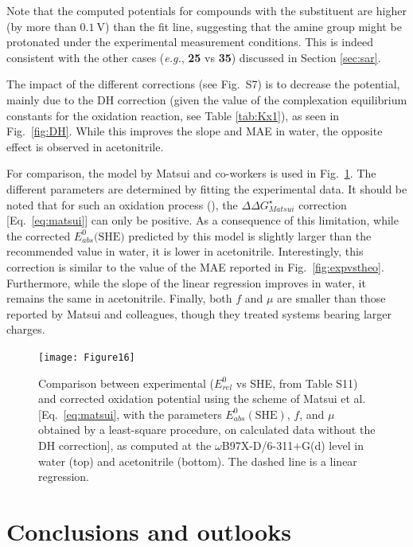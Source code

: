 \documentclass[review,preprint]{elsarticle}
\begin{document}
Note that the computed potentials for compounds with the   substituent are higher (by more than $\SI{0.1}{\volt}$) than the fit line, suggesting that the amine group might be protonated under the experimental measurement conditions. This is indeed consistent with the other cases (\textit{e.g.}, \textbf{25} vs \textbf{35}) discussed in Section \ref{sec:sar}. 

The impact of the different corrections (see Fig.~S7) is to decrease the potential, mainly due to the DH correction (given the value of the complexation equilibrium constants for the oxidation reaction, see Table \ref{tab:Kx1}), as seen in Fig.~\ref{fig:DH}. While this improves the slope and MAE in water, the opposite effect is observed in acetonitrile.

For comparison, the model by Matsui and co-workers \cite{matsuiDensityFunctionalTheory2013} is used in Fig.~\ref{fig:matsui}. The different parameters are determined by fitting the experimental data. It should be noted that for such an oxidation process (), the $\Delta\Delta G^\star_{Matsui}$ correction [Eq.~\eqref{eq:matsui}] can only be positive. As a consequence of this limitation, while the corrected $E^0_{abs}(\text{SHE)}$  predicted by this model is slightly larger than the recommended value in water, it is lower in acetonitrile. Interestingly, this correction is similar to the value of the MAE reported in Fig.~\ref{fig:expvstheo}. Furthermore, while the slope of the linear regression improves in water, it remains the same in acetonitrile. Finally, both $f$ and $\mu$ are smaller than those reported by Matsui and colleagues, though they treated systems bearing larger charges.


\begin{figure}[!h]
	\centering
	\texttt{[image: Figure16]}
	\caption{Comparison between experimental ($E^0_{rel} $ vs SHE, from Table S11) and corrected oxidation potential using the scheme of Matsui et al. \cite{matsuiDensityFunctionalTheory2013} [Eq.~\eqref{eq:matsui}, with the parameters $E_{abs}^0(\text{SHE})$, $f$, and $\mu$ obtained by a least-square procedure, on calculated data without the DH correction], as computed at the $\omega$B97X-D/6-311+G(d) level in water (top) and acetonitrile (bottom). The dashed line is a linear regression. }
	\label{fig:matsui}
\end{figure}

\clearpage
\section{Conclusions and outlooks} \label{sec:conclusion}
\end{document}

